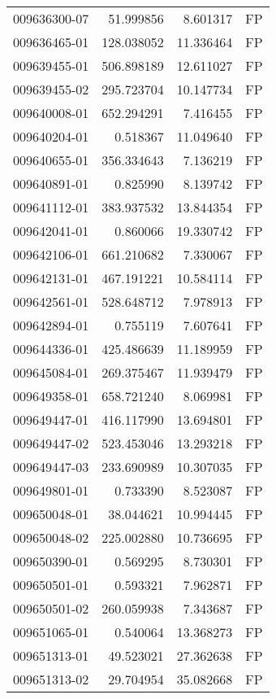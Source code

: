 \begin{tabular}{lrrl}
009636300-07 &   51.999856 &     8.601317 &   FP \\
009636465-01 &  128.038052 &    11.336464 &   FP \\
009639455-01 &  506.898189 &    12.611027 &   FP \\
009639455-02 &  295.723704 &    10.147734 &   FP \\
009640008-01 &  652.294291 &     7.416455 &   FP \\
009640204-01 &    0.518367 &    11.049640 &   FP \\
009640655-01 &  356.334643 &     7.136219 &   FP \\
009640891-01 &    0.825990 &     8.139742 &   FP \\
009641112-01 &  383.937532 &    13.844354 &   FP \\
009642041-01 &    0.860066 &    19.330742 &   FP \\
009642106-01 &  661.210682 &     7.330067 &   FP \\
009642131-01 &  467.191221 &    10.584114 &   FP \\
009642561-01 &  528.648712 &     7.978913 &   FP \\
009642894-01 &    0.755119 &     7.607641 &   FP \\
009644336-01 &  425.486639 &    11.189959 &   FP \\
009645084-01 &  269.375467 &    11.939479 &   FP \\
009649358-01 &  658.721240 &     8.069981 &   FP \\
009649447-01 &  416.117990 &    13.694801 &   FP \\
009649447-02 &  523.453046 &    13.293218 &   FP \\
009649447-03 &  233.690989 &    10.307035 &   FP \\
009649801-01 &    0.733390 &     8.523087 &   FP \\
009650048-01 &   38.044621 &    10.994445 &   FP \\
009650048-02 &  225.002880 &    10.736695 &   FP \\
009650390-01 &    0.569295 &     8.730301 &   FP \\
009650501-01 &    0.593321 &     7.962871 &   FP \\
009650501-02 &  260.059938 &     7.343687 &   FP \\
009651065-01 &    0.540064 &    13.368273 &   FP \\
009651313-01 &   49.523021 &    27.362638 &   FP \\
009651313-02 &   29.704954 &    35.082668 &   FP \\

\end{tabular}
